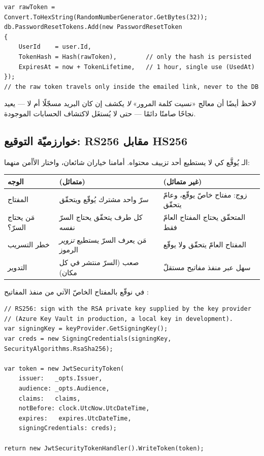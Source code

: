 \begin{english}
\begin{lstlisting}[language={[Sharp]C}]
var rawToken = Convert.ToHexString(RandomNumberGenerator.GetBytes(32));
db.PasswordResetTokens.Add(new PasswordResetToken
{
    UserId    = user.Id,
    TokenHash = Hash(rawToken),        // only the hash is persisted
    ExpiresAt = now + TokenLifetime,   // 1 hour, single use (UsedAt)
});
// the raw token travels only inside the emailed link, never to the DB
\end{lstlisting}
\end{english}

لاحظ أيضًا أن معالج «نسيت كلمة المرور» \emph{لا} يكشف إن كان البريد مسجّلًا أم لا —
يعيد نجاحًا صامتًا دائمًا — حتى لا يُستغَل لاكتشاف الحسابات الموجودة.

\subsection{خوارزميّة التوقيع: RS256 مقابل HS256}

الـ يُوقَّع كي لا يستطيع أحد تزييف محتواه. أمامنا خياران شائعان، واختار
 الأأمن منهما:

\begin{center}
\begin{tabular}{L{3.4cm} L{5.5cm} L{5.5cm}}
\toprule
\textbf{\color{spPrimary}الوجه} & \textbf{\color{spPrimary} (متماثل)} & \textbf{\color{spPrimary} (غير متماثل)} \\
\midrule
المفتاح & سرّ واحد مشترك يُوقّع ويتحقّق & زوج: مفتاح خاصّ يوقّع، وعامّ يتحقّق \\
مَن يحتاج السرّ؟ & كل طرف يتحقّق يحتاج السرّ نفسه & المتحقّق يحتاج المفتاح العامّ فقط \\
خطر التسريب & مَن يعرف السرّ يستطيع \emph{تزوير} الرموز & المفتاح العامّ يتحقّق ولا يوقّع \\
التدوير & صعب (السرّ منتشر في كل مكان) & سهل عبر منفذ مفاتيح مستقلّ \\
\bottomrule
\end{tabular}
\end{center}

في  نوقّع بالمفتاح الخاصّ الآتي من منفذ المفاتيح
:

\begin{english}
\begin{lstlisting}[language={[Sharp]C}]
// RS256: sign with the RSA private key supplied by the key provider
// (Azure Key Vault in production, a local key in development).
var signingKey = keyProvider.GetSigningKey();
var creds = new SigningCredentials(signingKey, SecurityAlgorithms.RsaSha256);

var token = new JwtSecurityToken(
    issuer:   _opts.Issuer,
    audience: _opts.Audience,
    claims:   claims,
    notBefore: clock.UtcNow.UtcDateTime,
    expires:   expires.UtcDateTime,
    signingCredentials: creds);

return new JwtSecurityTokenHandler().WriteToken(token);
\end{lstlisting}
\end{english}

